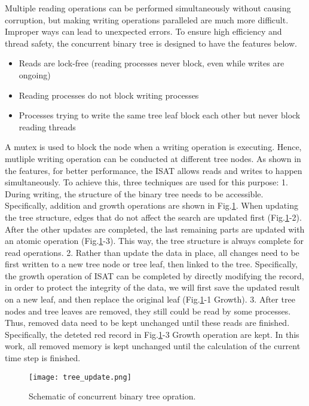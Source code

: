 Multiple reading operations can be performed simultaneously without causing corruption, but making writing operations paralleled are much more difficult. Improper ways can lead to unexpected errors. To ensure high efficiency and thread safety, the concurrent binary tree is designed to have the features below.

\begin{itemize}
	\item Reads are lock-free (reading processes never block, even while writes are ongoing)
	\item Reading processes do not block writing processes
	\item Processes trying to write the same tree leaf block each other but never block reading threads
\end{itemize}


A mutex is used to block the node when a writing operation is executing. Hence, mutliple writing operation can be conducted at different tree nodes. As shown in the features, for better performance, the ISAT allows reads and writes to happen simultaneously. To achieve this, three techniques are used for this purpose: 1. During writing, the structure of the binary tree needs to be accessible. Specifically, addition and growth operations are shown in Fig.\ref{MPI_op}. When updating the tree structure, edges that do not affect the search are updated first (Fig.\ref{MPI_op}-2). After the other updates are completed, the last remaining parts are updated with an atomic operation (Fig.\ref{MPI_op}-3). This way, the tree structure is always complete for read operations.
2. Rather than update the data in place, all changes need to be first written to a new tree node or tree leaf, then linked to the tree. Specifically, the growth operation of ISAT can be completed by directly modifying the record, in order to protect the integrity of the data, we will first save the updated result on a new leaf, and then replace the original leaf (Fig.\ref{MPI_op}-1 Growth).
3. After tree nodes and tree leaves are removed, they still could be read by some processes. Thus, removed data need to be kept unchanged until these reads are finished. Specifically, the deteted red record in Fig.\ref{MPI_op}-3 Growth operation are kept. In this work, all removed memory is kept unchanged until the calculation of the current time step is finished.

\begin{figure}[htbp]
	\centering
	\texttt{[image: tree\_update.png]}
	\caption{Schematic of concurrent binary tree opration. }
	\label{MPI_op}
\end{figure}


